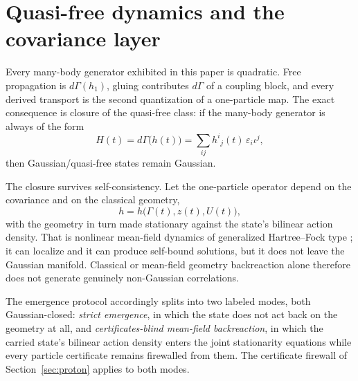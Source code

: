 \documentclass[11pt,letterpaper]{article}
\newcommand{\dG}{d\Gamma}
\begin{document}
\section{Quasi-free dynamics and the covariance layer}\label{sec:quasifree}

Every many-body generator exhibited in this paper is quadratic. Free
propagation is $\dG(h_1)$, gluing contributes $\dG$ of a coupling block, and
every derived transport is the second quantization of a one-particle map. The
exact consequence is closure of the quasi-free class: if the many-body
generator is always of the form
\begin{equation*}
  H(t)=\dG\bigl(h(t)\bigr)
  =\sum_{ij}h^{i}{}_{j}(t)\,\varepsilon_i\iota^j,
\end{equation*}
then Gaussian/quasi-free states remain Gaussian.

The closure survives self-consistency. Let the one-particle operator depend on
the covariance and on the classical geometry,
\begin{equation*}
  h=h\bigl(\Gamma(t),z(t),U(t)\bigr),
\end{equation*}
with the geometry in turn made stationary against the state's bilinear action
density. That is
nonlinear mean-field dynamics of generalized Hartree--Fock type
\cite{bls1994}; it can localize and it can produce self-bound solutions, but it
does not leave the Gaussian manifold. Classical or mean-field geometry
backreaction alone therefore does not generate genuinely non-Gaussian
correlations.

The emergence protocol accordingly splits into two labeled modes, both
Gaussian-closed: \emph{strict emergence}, in which the state does not act back
on the geometry at all, and \emph{certificates-blind mean-field backreaction},
in which the carried state's bilinear action density enters the joint
stationarity equations while every particle certificate remains firewalled
from them. The
certificate firewall of Section~\ref{sec:proton} applies to both modes.
\end{document}

